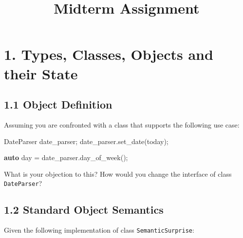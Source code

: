 \documentclass[]{article}
\title{Midterm Assignment}
\date{}
\newenvironment{Shaded}{}{}
\newcommand{\KeywordTok}[1]{\textcolor[rgb]{0.00,0.44,0.13}{\textbf{{#1}}}}
\newcommand{\NormalTok}[1]{{#1}}
\begin{document}
\maketitle

\section{1. Types, Classes, Objects and their
State}\label{types-classes-objects-and-their-state}

\subsection{1.1 Object Definition}\label{object-definition}

Assuming you are confronted with a class that supports the following use
case:

\begin{Shaded}
\begin{Highlighting}[]
\NormalTok{DateParser date_parser;}
\NormalTok{date_parser.set_date(today);}

\KeywordTok{auto} \NormalTok{day = date_parser.day_of_week();}
\end{Highlighting}
\end{Shaded}

What is your objection to this? How would you change the interface of
class \texttt{DateParser}?


\subsection{1.2 Standard Object
Semantics}\label{standard-object-semantics}

Given the following implementation of class \texttt{SemanticSurprise}:
\end{document}
